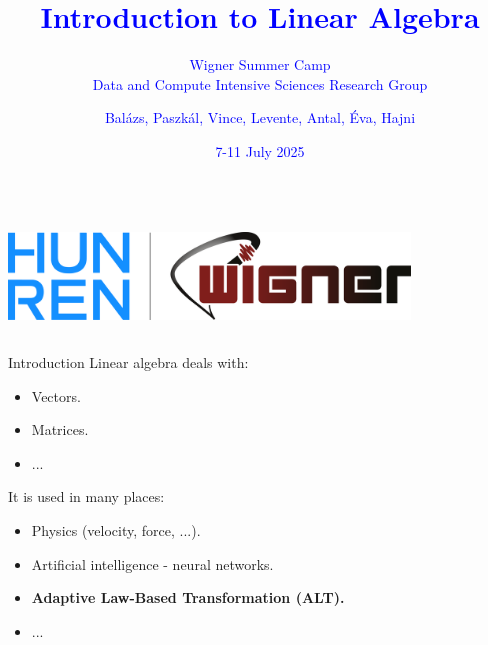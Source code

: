 \documentclass{beamer}
\title{\textcolor{blue}{Introduction to Linear Algebra}}
\subtitle{\textcolor{blue}{Wigner Summer Camp \\ Data and Compute Intensive Sciences Research Group}}
\author{\textcolor{blue}{Balázs, Paszkál, Vince, Levente, Antal, Éva, Hajni}}
\date{\textcolor{blue}{7-11 July 2025}}
\begin{document}
\begin{frame}
  \titlepage
  \begin{columns}
    \centering
    \centering
    \includegraphics[width=0.8\textwidth]{logo.png}
    \centering
  \end{columns}
\end{frame}

\begin{frame}{Introduction}
    Linear algebra deals with:
    \begin{itemize}
        \item Vectors.
        \item Matrices.
        \item ...
    \end{itemize}

    It is used in many places:
    \begin{itemize}
        \item Physics (velocity, force, ...).
        \item Artificial intelligence - neural networks.
        \item \textbf{Adaptive Law-Based Transformation (ALT).} 
        \item ...
    \end{itemize}
\end{frame}
\end{document}
